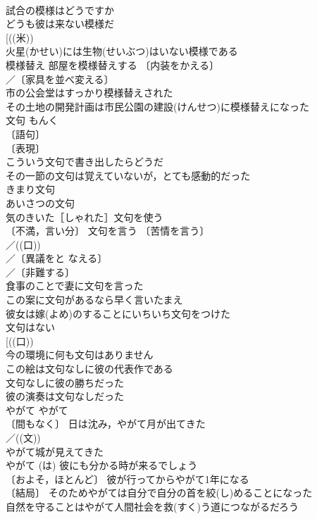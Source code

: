 \documentclass[8pt]{extreport}
\begin{document}
\begin{CJK}{UTF8}{min}
\\	試合の模様はどうですか 
\\	どうも彼は来ない模様だ 
\\	[((米))
\\	火星(かせい)には生物(せいぶつ)はいない模様である 
\\	模様替え 部屋を模様替えする 〔内装をかえる〕
\\	／〔家具を並べ変える〕
\\	市の公会堂はすっかり模様替えされた 
\\	その土地の開発計画は市民公園の建設(けんせつ)に模様替えになった 
\\	文句	もんく	
\\	〔語句〕
\\	〔表現〕
\\	こういう文句で書き出したらどうだ 
\\	その一節の文句は覚えていないが，とても感動的だった 
\\	きまり文句 
\\	あいさつの文句 
\\	気のきいた［しゃれた］文句を使う 
\\	〔不満，言い分〕 文句を言う 〔苦情を言う〕
\\	／((口)) 
\\	／〔異議をと なえる〕
\\	／〔非難する〕
\\	食事のことで妻に文句を言った 
\\	この案に文句があるなら早く言いたまえ 
\\	彼女は嫁(よめ)のすることにいちいち文句をつけた 
\\	文句はない 
\\	[((口))
\\	今の環境に何も文句はありません 
\\	この絵は文句なしに彼の代表作である 
\\	文句なしに彼の勝ちだった 
\\	彼の演奏は文句なしだった 
\\	やがて	やがて	
\\	〔間もなく〕 日は沈み，やがて月が出てきた 
\\	／((文))
\\	やがて城が見えてきた 
\\	やがて (は) 彼にも分かる時が来るでしょう 
\\	〔およそ，ほとんど〕 彼が行ってからやがて1年になる 
\\	〔結局〕 そのためやがては自分で自分の首を絞(し)めることになった 
\\	自然を守ることはやがて人間社会を救(すく)う道につながるだろう 

\end{CJK}
\end{document}
